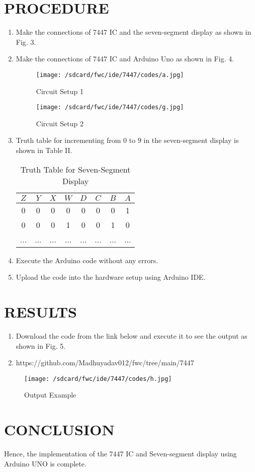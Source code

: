 \documentclass[conference]{IEEEtran}
\begin{document}
\section{PROCEDURE}
\begin{enumerate}
\item Make the connections of 7447 IC and the seven-segment display as shown in Fig. 3.
\item Make the connections of 7447 IC and Arduino Uno as shown in Fig. 4.

\begin{figure}[htbp] 
\centering 
\texttt{[image: /sdcard/fwc/ide/7447/codes/a.jpg]}
\caption{\label{fig-3:Gates} Circuit Setup 1}    
\end{figure}

\begin{figure}[htbp]                     
\centering                           
\texttt{[image: /sdcard/fwc/ide/7447/codes/g.jpg]}                                 
\caption{\label{fig-4:Gates} Circuit Setup 2}         
\end{figure}

\item Truth table for incrementing from $0$ to $9$ in the seven-segment display is shown in Table II.

\begin{table}[htbp]
\centering
\begin{tabular}{| c | c | c | c | c | c | c | c |} 
\hline
$Z$ & $Y$ & $X$ & $W$ & $D$ & $C$ & $B$ & $A$ \\
\hline
0   & 0   & 0   & 0   & 0  & 0 & 0  & 1 \\
0   & 0   & 0   & 1   & 0  & 0 & 1  & 0 \\
... & ... & ... & ... & ... & ... & ... & ... \\ 
\hline
\end{tabular}
\vspace{0.15cm}
\caption{\label{tab:widgets} Truth Table for Seven-Segment Display}
\end{table}

\item Execute the Arduino code without any errors.
\item Upload the code into the hardware setup using Arduino IDE.
\end{enumerate}

\section{RESULTS}
\begin{enumerate}
\item Download the code from the link below and execute it to see the output as shown in Fig. 5.
\item https://github.com/Madhuyadav012/fwc/tree/main/7447
\end{enumerate}

\begin{figure}[htbp] 
\centering 
\texttt{[image: /sdcard/fwc/ide/7447/codes/h.jpg]}
\caption{\label{fig:Gates} Output Example}    
\end{figure}

\section{CONCLUSION}
Hence, the implementation of the 7447 IC and Seven-segment display using Arduino UNO is complete.
\end{document}
